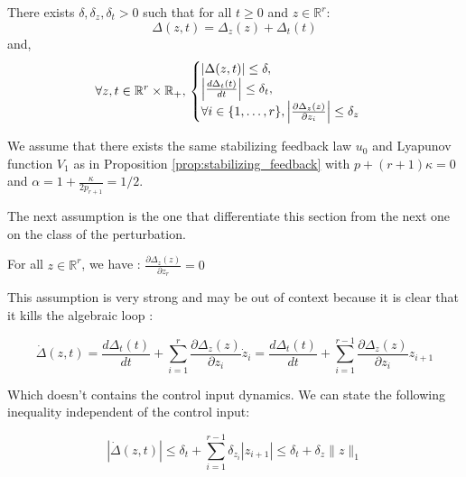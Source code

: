 \begin{assumption}
    \label{assumption:perturbation_easy_case}
    There exists \(\delta, \delta_z, \delta_t > 0 \) such that for all \( t \geq 0 \) and \( z \in \mathbb{R}^r \):
    \begin{equation}
        \Delta(z, t) = \Delta_z(z) + \Delta_t(t)
    \end{equation}
    and,
    \begin{equation}
        \forall z, t \in \mathbb{R}^r \times \mathbb{R}_+, \\
        \begin{cases}
            |\Delta(z, t)| \leq \delta, \\
            \left| \frac{d\Delta_t(t)}{dt} \right| \leq \delta_t, \\
            \forall i \in \{1, \ldots, r\}, \left| \frac{\partial \Delta_z(z)}{\partial z_i} \right| \leq \delta_{z}
        \end{cases}
    \end{equation}
\end{assumption}

We assume that there exists the same stabilizing feedback law \(u_0\) and Lyapunov function \(V_1\) as in
Proposition \ref{prop:stabilizing_feedback} with \(p + (r+1)\kappa = 0\) and \(\alpha = 1 + \frac{\kappa}{2p_{r+1}} =1/2\).


The next assumption is the one that differentiate this section from the next one on the class of the perturbation.

\begin{assumption}
    \label{assumption:H4_extended}
    For all \(z \in \mathbb{R}^r\), we have : \(\frac{\partial \Delta_z(z)}{\partial z_r} = 0\)
\end{assumption}

This assumption is very strong and may be out of context because it is clear that it kills the algebraic loop :

\begin{equation}
    \dot{\Delta}(z, t) = \frac{d\Delta_t(t)}{dt} + \sum_{i=1}^{r} \frac{\partial \Delta_z(z)}{\partial z_i} \dot{z}_i = \frac{d\Delta_t(t)}{dt} + \sum_{i=1}^{r-1} \frac{\partial \Delta_z(z)}{\partial z_i} z_{i+1}
\end{equation}

Which doesn't contains the control input dynamics. We can state the following inequality independent 
of the control input:

\begin{equation}
    |\dot{\Delta}(z, t)| \leq \delta_t + \sum_{i=1}^{r-1} \delta_{z_i} |z_{i+1}| \leq \delta_t + \delta_z \|z\|_1
\end{equation}

